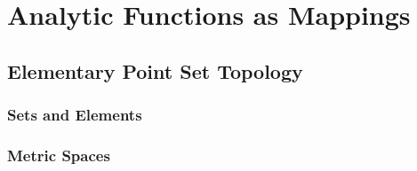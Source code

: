 \chapter{Analytic Functions as Mappings}

\section{Elementary Point Set Topology}

\subsection{Sets and Elements}

\subsection{Metric Spaces}

